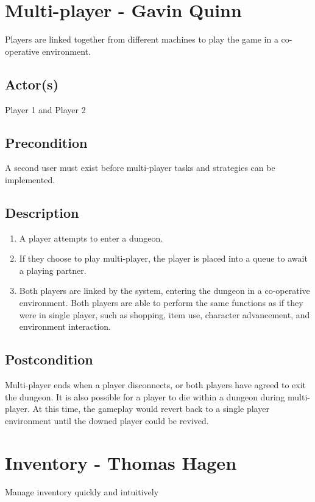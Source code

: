 \documentclass[11pt]{article}
\begin{document}
\section{Multi-player - Gavin Quinn}
	Players are linked together from different machines to play the game in a co-operative environment.

		\subsection{Actor(s)}
		
			Player 1 and Player 2

		\subsection{Precondition}
 
			A second user must exist before multi-player tasks and strategies can be implemented.
	
		\subsection{Description}
			\begin{enumerate}
			\item A player attempts to enter a dungeon.
			\item If they choose to play multi-player, the player is placed into a queue to await a playing partner.
			\item Both players are linked by the system, entering the dungeon in a co-operative environment. Both players are able to perform the same functions as if they were in single player, such as shopping, item use, character advancement, and environment interaction.
			\end{enumerate}

		\subsection{Postcondition}
		
			Multi-player ends when a player disconnects, or both players have agreed to exit the dungeon. It is also possible for a player to die within a dungeon during multi-player. At this time, the gameplay would revert back to a single player environment until the downed player could be revived. 



\section{Inventory - Thomas Hagen}
	Manage inventory quickly and intuitively
\end{document}
